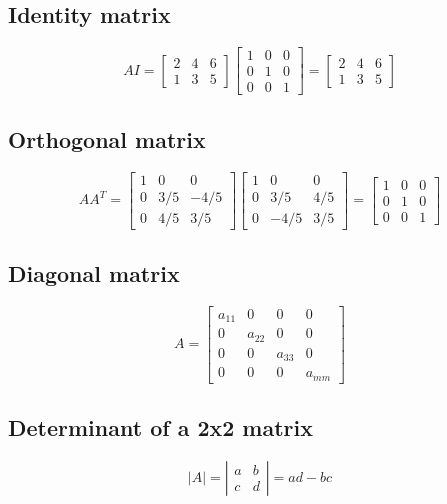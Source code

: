 \documentclass[a4paper, 12pt]{article}
\begin{document}
\subsection{Identity matrix}

\[
AI = \begin{bmatrix}2 & 4 & 6 \\ 1 & 3 & 5 \end{bmatrix} \begin{bmatrix} 1 & 0 & 0 \\ 0 & 1 & 0 \\ 0 & 0 & 1 \end{bmatrix} = \begin{bmatrix}2 & 4 & 6 \\ 1 & 3 & 5 \end{bmatrix}
\]

\subsection{Orthogonal matrix}

\[
AA^T = \begin{bmatrix} 1 & 0 & 0 \\ 0 & 3/5 & -4/5 \\ 0 & 4/5 & 3/5 \end{bmatrix} \begin{bmatrix} 1 & 0 & 0 \\ 0 & 3/5 & 4/5 \\ 0 & -4/5 & 3/5 \end{bmatrix} = \begin{bmatrix} 1 & 0 & 0 \\ 0 & 1 & 0 \\ 0 & 0 & 1 \end{bmatrix}
\]

\subsection{Diagonal matrix}

\[
A = \begin{bmatrix} a_{11} & 0 & 0 & 0 \\ 0 & a_{22} & 0 & 0 \\ 0 & 0 & a_{33} & 0 \\ 0 & 0 & 0 & a_{mm} \end{bmatrix}
\]

\subsection{Determinant of a 2x2 matrix}

\[
{\lvert}A\rvert = \left| \begin{array}{cc} a & b \\ c & d \end{array} \right| = ad - bc
\]
\end{document}
